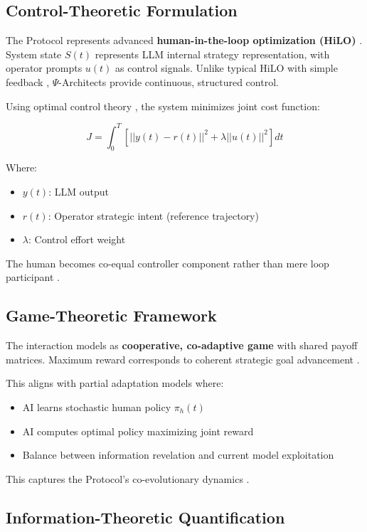 \documentclass[10pt,twocolumn]{article}
\begin{document}
\subsection{Control-Theoretic Formulation}

The Protocol represents advanced \textbf{human-in-the-loop optimization (HiLO)} \cite{ref40}. System state $S(t)$ represents LLM internal strategy representation, with operator prompts $u(t)$ as control signals. Unlike typical HiLO with simple feedback \cite{ref40}, $\Psi$-Architects provide continuous, structured control.

Using optimal control theory \cite{ref41}, the system minimizes joint cost function:

\begin{equation}
J = \int_{0}^{T} [||y(t) - r(t)||^2 + \lambda||u(t)||^2]dt
\end{equation}

Where:
\begin{itemize}
\item $y(t)$: LLM output
\item $r(t)$: Operator strategic intent (reference trajectory)
\item $\lambda$: Control effort weight
\end{itemize}

The human becomes co-equal controller component rather than mere loop participant \cite{ref41}.

\subsection{Game-Theoretic Framework}

The interaction models as \textbf{cooperative, co-adaptive game} \cite{ref45} with shared payoff matrices. Maximum reward corresponds to coherent strategic goal advancement \cite{ref46}.

This aligns with partial adaptation models \cite{ref46} where:
\begin{itemize}
\item AI learns stochastic human policy $\pi_h(t)$
\item AI computes optimal policy maximizing joint reward
\item Balance between information revelation and current model exploitation
\end{itemize}

This captures the Protocol's co-evolutionary dynamics \cite{ref47}.

\subsection{Information-Theoretic Quantification}
\end{document}
